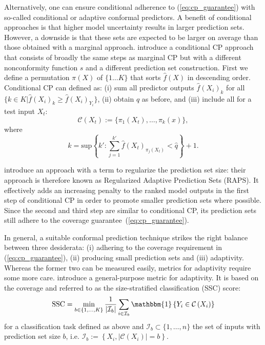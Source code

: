 \documentclass[11pt]{article}
\begin{document}
Alternatively, one can ensure conditional adherence to (\ref{eq:cp_guarantee}) with so-called conditional or adaptive conformal predictors. A benefit of conditional approaches is that higher model uncertainty results in larger prediction sets. However, a downside is that these sets are expected to be larger on average than those obtained with a marginal approach.\citet{romano2020classification} introduce a conditional CP approach that consists of broadly the same steps as marginal CP but with a different nonconformity function $s$ and a different prediction set construction. First we define a permutation $\pi(X)$ of $\{1\dots K\}$ that sorts $\hat{f}(X)$ in descending order. Conditional CP can defined as: (i) sum all predictor outputs $\hat{f}(X_i)_k$ for all $\{k \in K|\hat{f}(X_i)_k \geq \hat{f}(X_i)_{Y_i}\}$, (ii) obtain $\hat{q}$ as before, and (iii) include all for a test input $X_t$:
\begin{equation}
\label{eq:conditional_prediction_sets}
\mathcal{C}(X_t) := \{\pi_1(X_t),\dots,\pi_k(x)\},
\end{equation}
where
\begin{equation}
    \label{eq:k_conditional_ps}
    k=\text{sup}\left\{ k': \sum_{j=1}^{k'} \hat{f}(X_t)_{\pi_j(X_t)} < \hat{q} \right\} + 1.
\end{equation}

\citet{angelopoulos2020uncertainty} introduce an approach with a term to regularize the prediction set size: their approach is therefore known as Regularized Adaptive Prediction Sets (RAPS). It effectively adds an increasing penalty to the ranked model outputs in the first step of conditional CP in order to promote smaller prediction sets where possible. Since the second and third step are similar to conditional CP, its prediction sets still adhere to the coverage guarantee~(\ref{eq:cp_guarantee}).

In general, a suitable conformal prediction technique strikes the right balance between three desiderata: (i) adhering to the coverage requirement in (\ref{eq:cp_guarantee}), (ii) producing small prediction sets and (iii) adaptivity. Whereas the former two can be measured easily, metrics for adaptivity require some more care. \citet{angelopoulos2020uncertainty} introduce a general-purpose metric for adaptivity. It is based on the coverage and referred to as the size-stratified classification (SSC) score:
\begin{equation}
\label{eq:ssc}
\text{SSC} = \min_{b \in \{1,\dots,K\}} \frac{1}{|\mathcal{I}_b|} \sum_{i\in\mathcal{I}_b} \mathbbm{1}\left\{ Y_i \in \mathcal{C}\left(X_i\right)\right\}
\end{equation}
for a classification task defined as above and $\mathcal{I}_b \subset \{1,\dots,n\}$ the set of inputs with prediction set size $b$, i.e. $\mathcal{I}_b := \left\{X_i, |\mathcal{C}(X_i)|=b\right\}$.
\end{document}
